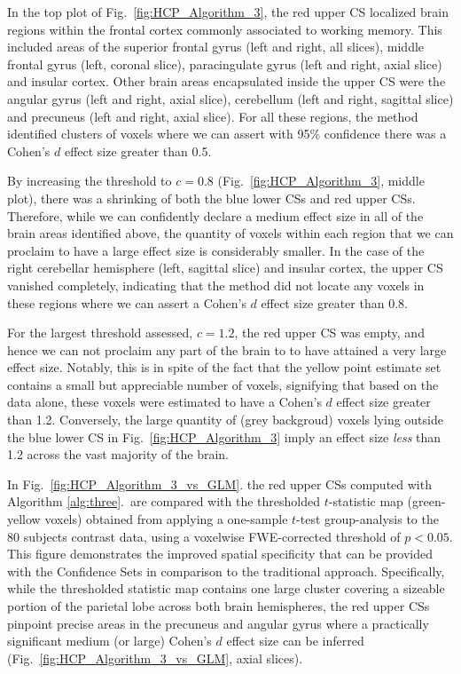 In the top plot of Fig.\ \ref{fig:HCP_Algorithm_3}, the red upper CS localized brain regions within the frontal cortex commonly associated to working memory. This included areas of the superior frontal gyrus (left and right, all slices), middle frontal gyrus (left, coronal slice), paracingulate gyrus (left and right, axial slice) and insular cortex. Other brain areas encapsulated inside the upper CS were the angular gyrus (left and right, axial slice), cerebellum (left and right, sagittal slice) and precuneus (left and right, axial slice). For all these regions, the method identified clusters of voxels where we can assert with 95\% confidence there was a Cohen's $d$ effect size greater than 0.5.

By increasing the threshold to $c = 0.8$ (Fig.\ \ref{fig:HCP_Algorithm_3}, middle plot), there was a shrinking of both the blue lower CSs and red upper CSs. Therefore, while we can confidently declare a medium effect size in all of the brain areas identified above, the quantity of voxels within each region that we can proclaim to have a large effect size is considerably smaller. In the case of the right cerebellar hemisphere (left, sagittal slice) and insular cortex, the upper CS vanished completely, indicating that the method did not locate any voxels in these regions where we can assert a Cohen's $d$ effect size greater than 0.8.

For the largest threshold assessed, $c = 1.2$, the red upper CS was empty, and hence we can not proclaim any part of the brain to to have attained a very large effect size. Notably, this is in spite of the fact that the yellow point estimate set contains a small but appreciable number of voxels, signifying that based on the data alone, these voxels were estimated to have a Cohen's $d$ effect size greater than 1.2. Conversely, the large quantity of (grey backgroud) voxels lying outside the blue lower CS in Fig.\ \ref{fig:HCP_Algorithm_3} imply an effect size \textit{less} than 1.2 across the vast majority of the brain.

In Fig.\ \ref{fig:HCP_Algorithm_3_vs_GLM}. the red upper CSs computed with Algorithm \ref{alg:three}.\ are compared with the thresholded $t$-statistic map (green-yellow voxels) obtained from applying a one-sample $t$-test group-analysis to the 80 subjects contrast data, using a voxelwise FWE-corrected threshold of $p < 0.05$. This figure demonstrates the improved spatial specificity that can be provided with the Confidence Sets in comparison to the traditional approach. Specifically, while the thresholded statistic map contains one large cluster covering a sizeable portion of the parietal lobe across both brain hemispheres, the red upper CSs pinpoint precise areas in the precuneus and angular gyrus where a practically significant medium (or large) Cohen's $d$ effect size can be inferred (Fig.\ \ref{fig:HCP_Algorithm_3_vs_GLM}, axial slices).

